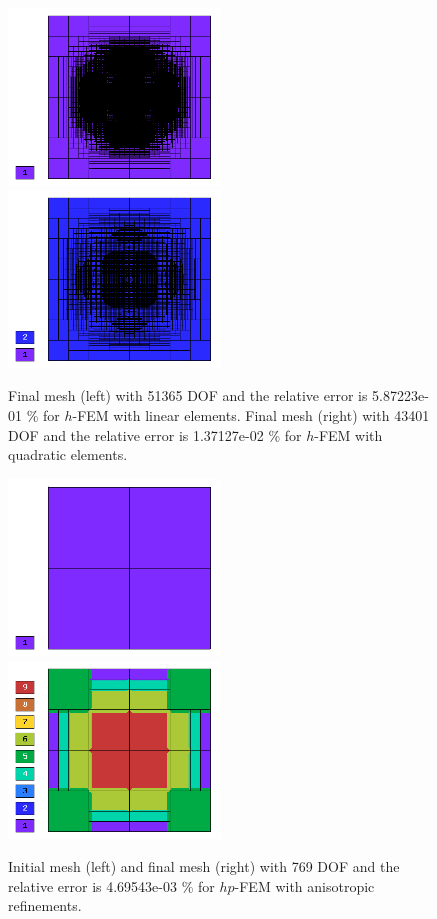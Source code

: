\documentclass[12pt]{elsarticle}
\begin{document}
\begin{figure}[H]
\centering
\vspace{-8mm}
\includegraphics[height=4.7cm]{nist/nist-1/mesh_h1_aniso.png}\ \
\includegraphics[height=4.7cm]{nist/nist-1/mesh_h2_aniso.png}
\vspace{-3mm}
\caption{
Final mesh (left) with 51365 DOF and the relative error is 5.87223e-01 \% for $h$-FEM with linear elements.
Final mesh (right) with 43401 DOF and the relative error is 1.37127e-02 \% for $h$-FEM with quadratic elements.}
\label{fig:nist-1-h-aniso}
\end{figure}

\begin{figure}[!ht]
\centering
\vspace{-8mm}
\includegraphics[height=4.7cm]{nist/nist-1/mesh_hp_aniso_init.png}\ \
\includegraphics[height=4.7cm]{nist/nist-1/mesh_hp_aniso.png}
\vspace{-3mm}
\caption{Initial mesh (left) and final mesh (right) with 769 DOF and the
relative error is 4.69543e-03 \% for $hp$-FEM with anisotropic refinements.}
\label{fig:nist-1-hp-aniso}
\vspace{-10mm}
\end{figure}
\end{document}
